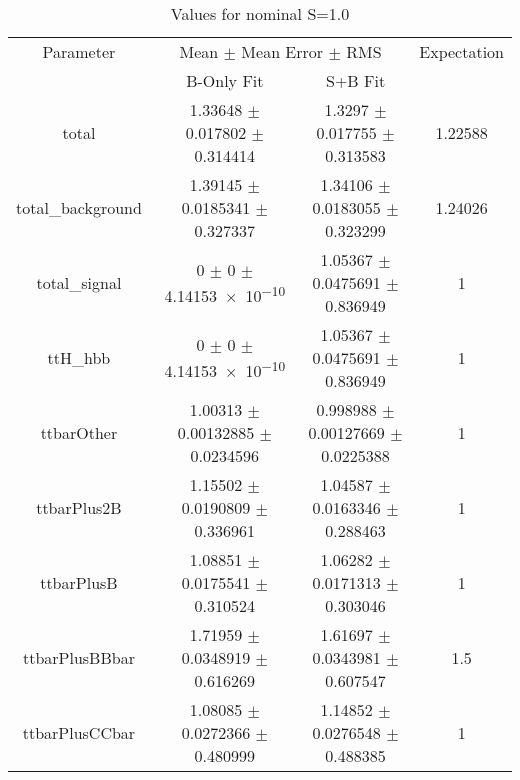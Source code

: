 \begin{table}
\centering
\caption{Values for nominal S=1.0}
\begin{tabular}{cccc}
\toprule
Parameter & \multicolumn{2}{c}{Mean $\pm$ Mean Error $\pm$ RMS} & Expectation\\
 & B-Only Fit & S+B Fit & \\
\midrule
total & \num{1.33648} $\pm$ \num{0.017802} $\pm$ \num{0.314414} & \num{1.3297} $\pm$ \num{0.017755} $\pm$ \num{0.313583} & \num{1.22588}\\
total\_background & \num{1.39145} $\pm$ \num{0.0185341} $\pm$ \num{0.327337} & \num{1.34106} $\pm$ \num{0.0183055} $\pm$ \num{0.323299} & \num{1.24026}\\
total\_signal & \num{0} $\pm$ \num{0} $\pm$ \num{4.14153e-10} & \num{1.05367} $\pm$ \num{0.0475691} $\pm$ \num{0.836949} & \num{1}\\
ttH\_hbb & \num{0} $\pm$ \num{0} $\pm$ \num{4.14153e-10} & \num{1.05367} $\pm$ \num{0.0475691} $\pm$ \num{0.836949} & \num{1}\\
ttbarOther & \num{1.00313} $\pm$ \num{0.00132885} $\pm$ \num{0.0234596} & \num{0.998988} $\pm$ \num{0.00127669} $\pm$ \num{0.0225388} & \num{1}\\
ttbarPlus2B & \num{1.15502} $\pm$ \num{0.0190809} $\pm$ \num{0.336961} & \num{1.04587} $\pm$ \num{0.0163346} $\pm$ \num{0.288463} & \num{1}\\
ttbarPlusB & \num{1.08851} $\pm$ \num{0.0175541} $\pm$ \num{0.310524} & \num{1.06282} $\pm$ \num{0.0171313} $\pm$ \num{0.303046} & \num{1}\\
ttbarPlusBBbar & \num{1.71959} $\pm$ \num{0.0348919} $\pm$ \num{0.616269} & \num{1.61697} $\pm$ \num{0.0343981} $\pm$ \num{0.607547} & \num{1.5}\\
ttbarPlusCCbar & \num{1.08085} $\pm$ \num{0.0272366} $\pm$ \num{0.480999} & \num{1.14852} $\pm$ \num{0.0276548} $\pm$ \num{0.488385} & \num{1}\\
\bottomrule
\end{tabular}
\end{table}